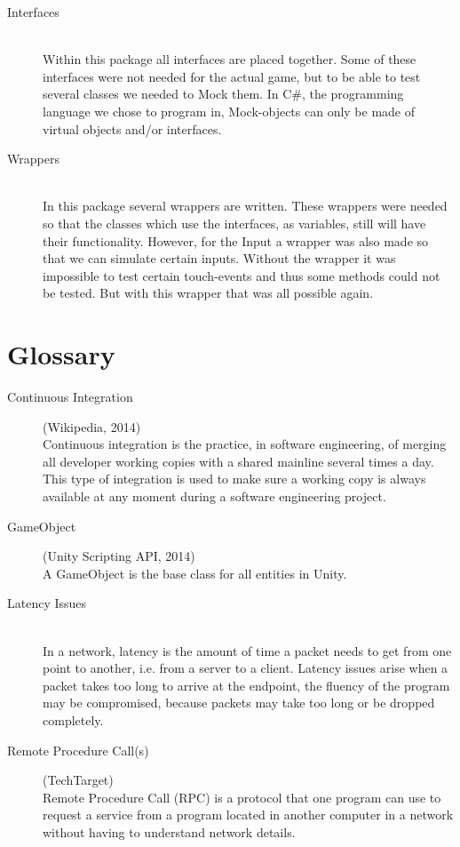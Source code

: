 \documentclass[11pt,twoside,a4paper]{article}
\begin{document}
\begin{description}
\item[Interfaces] \hfill \\
    Within this package all interfaces are placed together. Some of these interfaces were not needed for the actual game, but to be able to test several classes we needed to Mock them. In C\#, the programming language we chose to program in, Mock-objects can only be made of virtual objects and/or interfaces. 
\item[Wrappers] \hfill \\
    In this package several wrappers are written. These wrappers were needed so that the classes which use the interfaces, as variables, still will have their functionality. However, for the Input a wrapper was also made so that we can simulate certain inputs. Without the wrapper it was impossible to test certain touch-events and thus some methods could not be tested. But with this wrapper that was all possible again.
    
\end{description}

\newpage


\section{Glossary}
\begin{description}
\item[Continuous Integration] (Wikipedia, 2014) \hfill \\
Continuous integration is the practice, in software engineering, of merging all developer working copies with a shared mainline several times a day. This type of integration is used to make sure a working copy is always available at any moment during a software engineering project.
\item[GameObject] (Unity Scripting API, 2014) \hfill \\
A GameObject is the base class for all entities in Unity.
\item[Latency Issues] \hfill \\
In a network, latency is the amount of time a packet needs to get from one point to another, i.e. from a server to a client. Latency issues arise when a packet takes too long to arrive at the endpoint, the fluency of the program may be compromised, because packets may take too long or be dropped completely. 
\item[Remote Procedure Call(s)] (TechTarget) \hfill \\
Remote Procedure Call (RPC) is a protocol that one program can use to request a service from a program located in another computer in a network without having to understand network details.\\
\end{description}
\end{document}
